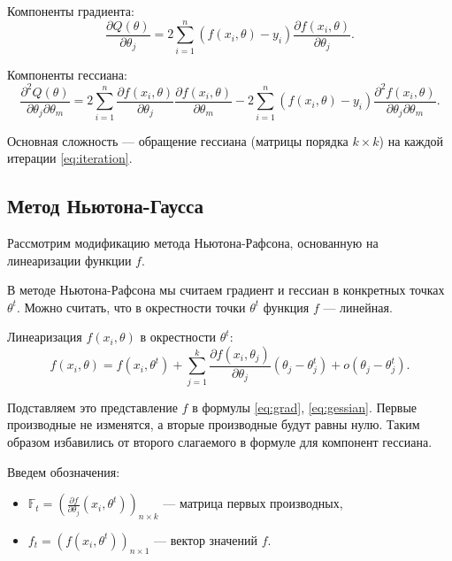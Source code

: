 \documentclass[11pt,colorlinks=true]{article}
\begin{document}
 Компоненты градиента:
\begin{equation}\label{eq:grad}
\frac{\partial Q(\theta)}{\partial \theta_{j}}
=
2\sum_{i=1}^{n}(f(x_{i},\theta)-y_{i})\frac{\partial f(x_{i},\theta)}{\partial \theta_j}.
\end{equation}

Компоненты гессиана:
\begin{equation}\label{eq:gessian}
\frac{\partial^{2} Q(\theta)}{\partial \theta_{j}\partial\theta_{m}}
=
2\sum_{i=1}^{n}
\frac{\partial f(x_{i},\theta)}{\partial\theta_{j}}
\frac{\partial f(x_{i},\theta)}{\partial\theta_{m}}
-
2\sum_{i=1}^{n}
(f(x_{i},\theta)-y_{i})
\frac{\partial^{2}f(x_{i},\theta)}{\partial\theta_{j}\partial\theta_{m}}.
\end{equation}


Основная сложность --- обращение гессиана (матрицы порядка $k\times k$) на каждой итерации \eqref{eq:iteration}. 

\subsection{Метод Ньютона-Гаусса}
Рассмотрим модификацию метода Ньютона-Рафсона, основанную на линеаризации функции $f$.

В методе Ньютона-Рафсона мы считаем градиент и гессиан в конкретных точках $\theta^{t}$. Можно считать, что в окрестности точки $\theta^{t}$ функция $f$ --- линейная.

 Линеаризация $f(x_{i},\theta)$ в окрестности $\theta^{t}$:
\begin{equation*}
f(x_{i},\theta)
=
f(x_{i},\theta^{t})
+
\sum_{j=1}^{k}
\frac{\partial f(x_{i},\theta_{j})}{\partial\theta_{j}}
(\theta_{j}-\theta_{j}^{t})
+
o(\theta_{j}-\theta_{j}^{t}).
\end{equation*}

 Подставляем это представление $f$ в формулы \eqref{eq:grad}, \eqref{eq:gessian}. Первые производные не изменятся, а вторые производные будут равны нулю. Таким образом избавились от второго слагаемого в формуле для компонент гессиана.
 
Введем обозначения:
\begin{itemize}
\item  $\mathbb{F}_{t}=(\frac{\partial f}{\partial\theta_{j}}(x_{i},\theta^{t}))_{n\times k}$ --- матрица первых производных,
\item  $f_{t}=(f(x_{i},\theta^{t}))_{n\times 1}$ --- вектор значений $f$.
\end{itemize}
\end{document}
